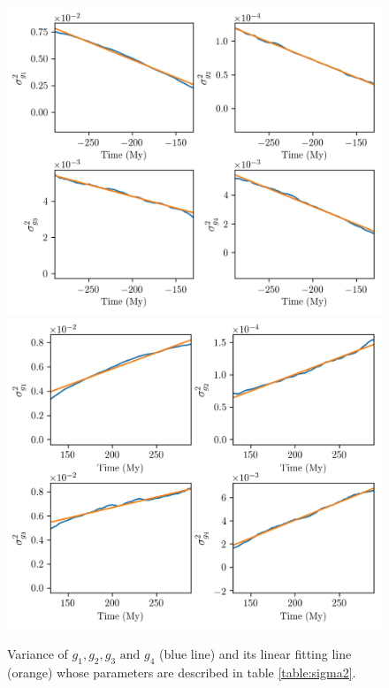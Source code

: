 \documentclass[12pt]{article}
\newcounter{para}[subsection]
\begin{document}
	\begin{figure}
		\centering
		\includegraphics[scale=0.85]{figures/sigma_g2}
		\includegraphics[scale=0.85]{figures/sigma_g_+}
		\caption{Variance of $g_1, g_2, g_3 \text{ and } g_4$ (blue line) and its linear fitting line (orange) whose parameters are described in table \ref{table:sigma2}.  }
		\label{fig:variance}
	\end{figure}
	
\end{document}
